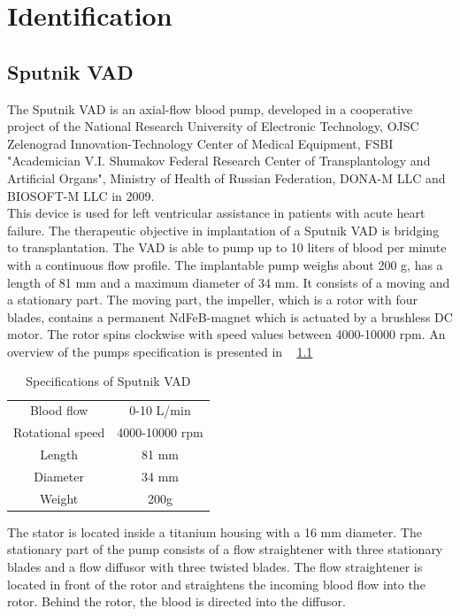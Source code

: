 \chapter{Identification}
\section{Sputnik VAD}
The Sputnik VAD is an axial-flow blood pump, developed in a cooperative project of the National Research University of Electronic Technology, OJSC Zelenograd Innovation-Technology Center of Medical Equipment, FSBI "Academician V.I. Shumakov Federal Research Center of Transplantology and Artificial Organs", Ministry of Health of Russian Federation, DONA-M LLC and BIOSOFT-M LLC in 2009. \cite{Sputnik1}
\\This device is used for left ventricular assistance in patients with acute heart failure. The therapeutic objective in implantation of a Sputnik VAD is bridging to transplantation. The VAD is able to pump up to 10 liters of blood per minute with a continuous flow profile. The implantable pump weighs about 200 g, has a length of 81 mm and a maximum diameter of 34 mm. It consists of a moving and a stationary part. The moving part, the impeller, which is a rotor with four blades, contains a permanent NdFeB-magnet which is actuated by a brushless DC motor. The rotor spins clockwise with speed values between 4000-10000 rpm. An overview of the pumps specification is presented in \tablename~ \ref{tab:sput1}
\begin{table}[h]
  \centering
  \begin{tabular}{c|c}
    \toprule
    Blood flow  & 0-10 L/min \\
    Rotational speed & 4000-10000 rpm \\
    Length & 81 mm \\
    Diameter & 34 mm \\
    Weight & 200g \\
    \bottomrule
\end{tabular}
  \caption{Specifications of Sputnik VAD}
  \label{tab:sput1}
\end{table}
The stator is located inside a titanium housing with a 16 mm diameter. The stationary part of the pump consists of a flow straightener with three stationary blades and a flow diffusor with three twisted blades. The flow straightener is located in front of the rotor and straightens the incoming blood flow into the rotor. Behind the rotor, the blood is directed into the diffusor. %
